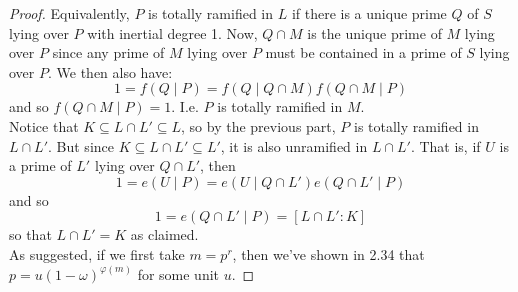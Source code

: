 \begin{proof}
	Equivalently, $P$ is totally ramified in $L$ if there is a unique prime $Q$ of $S$ lying over $P$ with inertial degree 1. Now, $Q \cap M$ is the unique prime of $M$ lying over $P$ since any prime of $M$ lying over $P$ must be contained in a prime of $S$ lying over $P$. We then also have:
	\[ 1 = f(Q \mid P) = f(Q \mid Q \cap M)f(Q \cap M \mid P) \]
	and so $f(Q \cap M \mid P) = 1$. I.e. $P$ is totally ramified in $M$. \\
	
	Notice that $K \subseteq L \cap L' \subseteq L$, so by the previous part, $P$ is totally ramified in $L \cap L'$. But since $K \subseteq L \cap L' \subseteq L'$, it is also unramified in $L \cap L'$. That is, if $U$ is a prime of $L'$ lying over $Q \cap L'$, then
	\[ 1 = e(U \mid P) = e(U \mid Q \cap L')e(Q \cap L' \mid P) \]
	and so
	\[ 1 = e(Q \cap L' \mid P) = [L \cap L' : K] \]
	so that $L \cap L' = K$ as claimed. \\
	
	As suggested, if we first take $m = p^r$, then we've shown in 2.34 that $p = u(1-\omega)^{\varphi(m)}$ for some unit $u$.
\end{proof}
